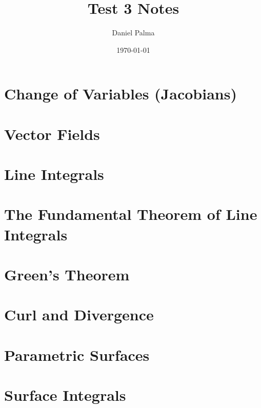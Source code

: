 \documentclass{article}
\author{Daniel Palma}
\date{\today}
\title{Test 3 Notes}
\begin{document}
\maketitle
\newpage

\tableofcontents
\newpage

\section{Change of Variables (Jacobians)}

\newpage
\section{Vector Fields}

\newpage
\section{Line Integrals}

\newpage
\section{The Fundamental Theorem of Line Integrals}

\newpage
\section{Green's Theorem}

\newpage
\section{Curl and Divergence}

\newpage
\section{Parametric Surfaces}

\newpage
\section{Surface Integrals}
\end{document}

